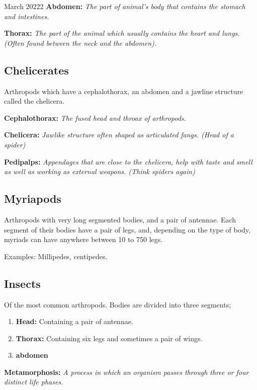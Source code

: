 \documentclass[12pt,oneside]{book} %
\begin{document}
\begin{lec}{March 20222}
  \textbf{Abdomen:} \textit{The part of animal's body that contains the stomach and
  intestines.}
  
  \textbf{Thorax:} \textit{The part of the animal which usually contains the heart and
    lungs. (Often found between the neck and the abdomen).}
  
  \subsection*{Chelicerates}
  Arthropods which have a cephalothorax, an abdomen and a jawline structure called the chelicera.

  \textbf{Cephalothorax:} \textit{The fused head and throax of arthropods.}
  
  \textbf{Chelicera:} \textit{Jawlike structure often shaped as articulated fangs. (Head of a spider)}

  \textbf{Pedipalps:} \textit{Appendages that are close to the chelicera, help with taste and smell as well as working
    as external weapons. (Think spiders again)}

  \newpage

  \subsection*{Myriapods}
  Arthropods with very long segmented bodies, and a pair of antennae. Each segment of their bodies have a pair of legs,
  and, depending on the type of body, myriads can have anywhere between 10 to 750 legs.

  Examples: Millipedes, centipedes.


  \subsection*{Insects}

  Of the most common arthropods. Bodies are divided into three segments;

  \begin{enumerate}
    \item \textbf{Head:} Containing a pair of antennae.
    \item \textbf{Thorax:} Containing six legs and sometimes a pair of wings.
    \item \textbf{abdomen} 
  \end{enumerate}


  \textbf{Metamorphosis:} \textit{A process in which an organism passes through three or four distinct life phases.}


\end{lec}
\end{document}
